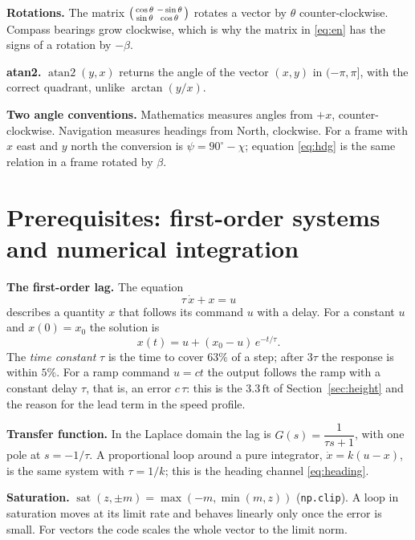\documentclass[11pt,a4paper]{article}
\newcommand{\code}[1]{\texttt{#1}}
\newcommand{\un}[1]{\,\mathrm{#1}}
\newcommand{\sat}{\operatorname{sat}}
\begin{document}
\textbf{Rotations.} The matrix
$\begin{psmallmatrix}\cos\theta&-\sin\theta\\ \sin\theta&\cos\theta\end{psmallmatrix}$
rotates a vector by $\theta$ counter-clockwise. Compass bearings grow
clockwise, which is why the matrix in \eqref{eq:en} has the signs of a
rotation by $-\beta$.

\textbf{atan2.} $\operatorname{atan2}(y,x)$ returns the angle of the vector
$(x,y)$ in $(-\pi,\pi]$, with the correct quadrant, unlike $\arctan(y/x)$.

\textbf{Two angle conventions.} Mathematics measures angles from $+x$,
counter-clockwise. Navigation measures headings from North, clockwise. For a
frame with $x$ east and $y$ north the conversion is
$\psi=90^\circ-\chi$; equation \eqref{eq:hdg} is the same relation in a frame
rotated by $\beta$.

\section{Prerequisites: first-order systems and numerical integration}\label{app:first}

\textbf{The first-order lag.} The equation
\begin{equation}
\tau\,\dot x + x = u
\end{equation}
describes a quantity $x$ that follows its command $u$ with a delay. For a
constant $u$ and $x(0)=x_0$ the solution is
\[
x(t) = u + (x_0-u)\,e^{-t/\tau}.
\]
The \emph{time constant} $\tau$ is the time to cover $63\%$ of a step; after
$3\tau$ the response is within $5\%$. For a ramp command $u=ct$ the output
follows the ramp with a constant delay $\tau$, that is, an error $c\,\tau$:
this is the $3.3\un{ft}$ of Section~\ref{sec:height} and the reason for the
lead term in the speed profile.

\textbf{Transfer function.} In the Laplace domain the lag is
$G(s)=\dfrac{1}{\tau s+1}$, with one pole at $s=-1/\tau$. A proportional loop
around a pure integrator, $\dot x=k(u-x)$, is the same system with $\tau=1/k$;
this is the heading channel \eqref{eq:heading}.

\textbf{Saturation.} $\sat(z,\pm m)=\max(-m,\min(m,z))$ (\code{np.clip}). A
loop in saturation moves at its limit rate and behaves linearly only once the
error is small. For vectors the code scales the whole vector to the limit norm.
\end{document}
